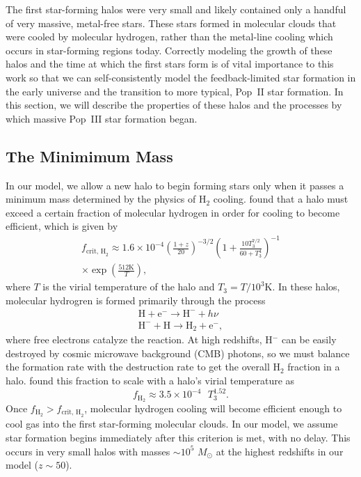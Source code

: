 \documentclass[a4paper,fleqn,usenatbib]{mnras}
\begin{document}
The first star-forming halos were very small and likely contained only a handful of very massive, metal-free stars.  These stars formed in molecular clouds that were cooled by molecular hydrogen, rather than the metal-line cooling which occurs in star-forming regions today.  Correctly modeling the growth of these halos and the time at which the first stars form is of vital importance to this work so that we can self-consistently model the feedback-limited star formation in the early universe and the transition to more typical, Pop~II star formation. In this section, we will describe the properties of these halos and the processes by which massive Pop~III star formation began.

\subsection{The Minimimum Mass}
\label{sec:min_mass}

In our model, we allow a new halo to begin forming stars only when it passes a minimum mass determined by the physics of H$_2$ cooling. 
\citet{tegmark_97} found that a halo must exceed a certain fraction of molecular hydrogen in order for cooling to become efficient, which is given by
\begin{multline}
f_{\text{crit, H}_2} \approx 1.6 \times 10^{-4} \left( \frac{1+z}{20}\right)^{-3/2}
\left( 1 + \frac{10 T_3^{7/2}}{60 + T_3^4}\right)^{-1} 
\\ \times \exp{\left(\frac{512 \text{K}}{T}\right)},
\label{eq:fh2}
\end{multline}
where $T$ is the virial temperature of the halo and $T_3 = T / 10^3$K.  In these halos, molecular hydrogren is formed primarily through the process
\begin{align}
\text{H} + \text{e}^- \rightarrow \text{H}^- + h\nu
\\
\text{H}^- + \text{H} \rightarrow \text{H}_2 + \text{e}^-,
\end{align}
where free electrons catalyze the reaction.  At high redshifts, H$^-$ can be easily destroyed by cosmic microwave background (CMB) photons, so we must balance the formation rate with the destruction rate to get the overall H$_2$ fraction in a halo.  \citet{tegmark_97} found this fraction to scale with a halo's virial temperature as
\begin{equation}
f_{\text{H}_2} \approx 3.5 \times 10^{-4} \text{ }T_3^{1.52}.
\end{equation}
Once $f_{\text{H}_2} > f_{\text{crit, H}_2}$, molecular hydrogen cooling will become efficient enough to cool gas into the first star-forming molecular clouds. In our model, we assume star formation begins immediately after this criterion is met, with no delay. This occurs in very 
small halos with masses $\sim 10^5$ $M_\odot$ at the highest redshifts in our model ($z \sim 50$).
\end{document}

